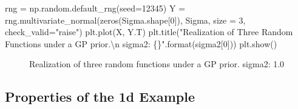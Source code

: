 \documentclass[
  letterpaper,
  DIV=11,
  numbers=noendperiod]{scrreprt}
\newenvironment{Shaded}{\begin{snugshade}}{\end{snugshade}}
\newcommand{\BuiltInTok}[1]{\textcolor[rgb]{0.00,0.23,0.31}{#1}}
\newcommand{\CharTok}[1]{\textcolor[rgb]{0.13,0.47,0.30}{#1}}
\newcommand{\DecValTok}[1]{\textcolor[rgb]{0.68,0.00,0.00}{#1}}
\newcommand{\NormalTok}[1]{\textcolor[rgb]{0.00,0.23,0.31}{#1}}
\newcommand{\OperatorTok}[1]{\textcolor[rgb]{0.37,0.37,0.37}{#1}}
\newcommand{\SpecialCharTok}[1]{\textcolor[rgb]{0.37,0.37,0.37}{#1}}
\newcommand{\StringTok}[1]{\textcolor[rgb]{0.13,0.47,0.30}{#1}}
\begin{document}
\begin{Shaded}
\begin{Highlighting}[]
\NormalTok{rng }\OperatorTok{=}\NormalTok{ np.random.default\_rng(seed}\OperatorTok{=}\DecValTok{12345}\NormalTok{)}
\NormalTok{Y }\OperatorTok{=}\NormalTok{ rng.multivariate\_normal(zeros(Sigma.shape[}\DecValTok{0}\NormalTok{]), Sigma, size }\OperatorTok{=} \DecValTok{3}\NormalTok{, check\_valid}\OperatorTok{=}\StringTok{"raise"}\NormalTok{)}
\NormalTok{plt.plot(X, Y.T)}
\NormalTok{plt.title(}\StringTok{"Realization of Three Random Functions under a GP prior.}\CharTok{\textbackslash{}n}\StringTok{ sigma2: }\SpecialCharTok{\{\}}\StringTok{"}\NormalTok{.}\BuiltInTok{format}\NormalTok{(sigma2[}\DecValTok{0}\NormalTok{]))}
\NormalTok{plt.show()}
\end{Highlighting}
\end{Shaded}

\begin{figure}[H]


\caption{\label{fig-mvn1-3}Realization of three random functions under a
GP prior. sigma2: 1.0}

\end{figure}%

\subsection{Properties of the 1d
Example}\label{properties-of-the-1d-example}
\end{document}
